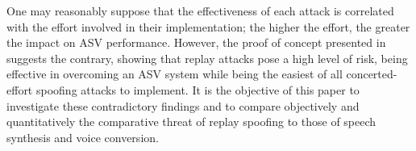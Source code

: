 One may reasonably suppose that the effectiveness of each attack is correlated with the effort involved in their implementation; the higher the effort, the greater the impact on ASV performance. However, the proof of concept presented in~\cite{Alegre2014} suggests the contrary, showing that replay attacks pose a high level of risk, being effective in overcoming an ASV system while being the easiest of all concerted-effort spoofing attacks to implement.  It is the objective of this paper to investigate these contradictory findings and to compare objectively and quantitatively the comparative threat of replay spoofing to those of speech synthesis and voice conversion.